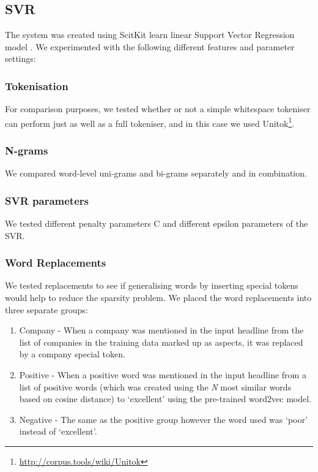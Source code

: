 \documentclass[11pt,a4paper]{article}
\begin{document}
\subsection{SVR}
The system was created using ScitKit learn \cite{pedregosa2011scikit} linear Support Vector Regression model \cite{drucker1997support}. We experimented with the following different features and parameter settings:

\subsubsection{Tokenisation}
For comparison purposes, we tested whether or not a simple whitespace tokeniser can perform just as well as a full tokeniser, and in this case we used Unitok\footnote{\url{http://corpus.tools/wiki/Unitok}}.

\subsubsection{N-grams}
We compared word-level uni-grams and bi-grams separately and in combination.

\subsubsection{SVR parameters}
We tested different penalty parameters C and different epsilon parameters of the SVR.

\subsubsection{Word Replacements}
We tested replacements to see if generalising words by inserting special tokens would help to reduce the sparsity problem. We placed the word replacements into three separate groups:
\begin{enumerate}
\item Company - When a company was mentioned in the input headline from the list of companies in the training data marked up as aspects, it was replaced by a company special token.
\item Positive - When a positive word was mentioned in the input headline from a list of positive words (which was created using the \textit{N} most similar words based on cosine distance) to `excellent' using the pre-trained word2vec model.
\item Negative - The same as the positive group however the word used was `poor' instead of `excellent'.
\end{enumerate}
\end{document}
